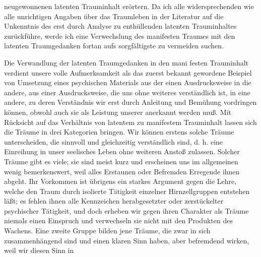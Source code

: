 \documentclass[twoside=true,titlepage=false,open=any, parskip=never, fontsize=10pt, headings=small, chapterprefix=false, appendixprefix=false]{scrbook}
\begin{document}
         
            
            
            
        \pstart
        neugewonnenen latenten Trauminhalt erörtern. Da ich alle
               widersprechenden wie alle unrichtigen Angaben über das Traumleben in
               der Literatur auf die Unkenntnis des erst durch Analyse zu enthüllenden latenten
               Trauminhaltes zurückführe, werde ich eine Verwechslung des manifesten Traumes mit den
               latenten Traumgedanken fortan aufs sorgfältigste zu
                  vermeiden suchen.
        \pend
    
         
            
            
            \pstart{}\pend
            
        \pstart
        Die Verwandlung der latenten Traumgedanken in den mani festen Trauminhalt
               verdient unsere volle Aufmerksamkeit als das zuerst bekannt gewordene Beispiel
               von Umsetzung eines psychischen Materials aus der einen
               Ausdrucksweise in die andere, aus einer Ausdrucksweise, die uns ohne weiteres
               verständlich ist, in eine andere, zu deren Verständnis wir erst durch Anleitung
               und Bemühung vordringen können, obwohl auch sie als Leistung unserer  anerkannt werden muß. Mit Rücksicht auf das Verhältnis von latentem zu
               manifestem Trauminhalt lassen sich die Träume in drei Kategorien bringen. Wir
               können erstens solche Träume unterscheiden, die sinnvoll und gleichzeitig verständlich sind, d. h. eine Einreihung in unser seelisches Leben ohne
               weiteren Anstoß zulassen. Solcher Träume gibt es viele; sie sind meist kurz und
               erscheinen uns im allgemeinen wenig bemerkenswert, weil alles
               Erstaunen oder Befremden Erregende ihnen abgeht. Ihr Vorkommen ist übrigens ein
               starkes Argument gegen die Lehre, welche den Traum durch isolierte
               Tätigkeit einzelner Hirnzellgruppen entstehen läßt; es fehlen ihnen alle
               Kennzeichen herabgesetzter oder zerstückelter psychischer Tätigkeit, und doch
               erheben wir gegen ihren Charakter als Träume niemals einen Einspruch und
               verwechseln sie nicht mit den Produkten des Wachens. Eine zweite Gruppe bilden
               jene Träume, die zwar in sich zusammenhängend sind und einen klaren Sinn
               haben, aber befremdend wirken, weil wir diesen Sinn
               in
        \pend
    
\end{document}
